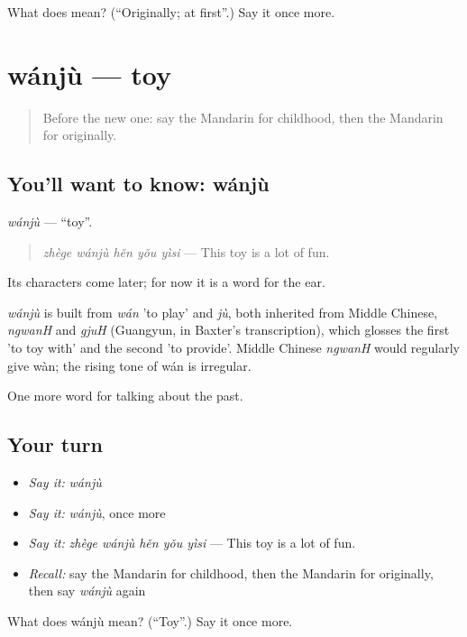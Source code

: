 \begin{tcolorbox}[breakable,colback=teal!4,colframe=teal!35!black,title={Before you move on}]
What does  mean? (\textquotedblleft{}Originally; at first\textquotedblright{}.) Say it once more.
\end{tcolorbox}
\section[wánjù]{wánjù — toy}

\label{lesson:ZH-C269-wanju}



\begin{quote}
Before the new one: say the Mandarin for childhood, then the Mandarin for originally.
\end{quote}

\subsection*{You'll want to know: wánjù}
\emph{wánjù} — \textquotedblleft{}toy\textquotedblright{}.

\begin{quote}
\emph{zhège wánjù hěn yǒu yìsi} — This toy is a lot of fun.
\end{quote}

Its characters come later; for now it is a word for the ear.

\begin{cousinweb}
\emph{wánjù} is built from \emph{wán} 'to play' and \emph{jù}, both inherited from Middle Chinese, \emph{ngwanH} and \emph{gjuH} (Guangyun, in Baxter's transcription), which glosses the first 'to toy with' and the second 'to provide'. Middle Chinese \emph{ngwanH} would regularly give wàn; the rising tone of wán is irregular.
\end{cousinweb}

\begin{grammarlens}[title={What you've built}]
One more word for talking about the past.
\end{grammarlens}

\subsection*{Your turn}
\begin{itemize}
\raggedright
  \item \emph{Say it:} \emph{wánjù}
  \item \emph{Say it:} \emph{wánjù}, once more
  \item \emph{Say it:} \emph{zhège wánjù hěn yǒu yìsi} — This toy is a lot of fun.
  \item \emph{Recall:} say the Mandarin for childhood, then the Mandarin for originally, then say \emph{wánjù} again
\end{itemize}

\begin{tcolorbox}[breakable,colback=teal!4,colframe=teal!35!black,title={Before you move on}]
What does wánjù mean? (\textquotedblleft{}Toy\textquotedblright{}.) Say it once more.
\end{tcolorbox}
